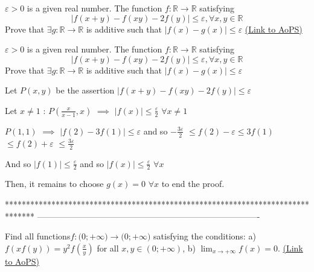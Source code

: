 \begin{problem}
	$\varepsilon>0 $ is a given real number. The function $ f: \mathbb R \to \mathbb R $ satisfying
\[\left | f (x + y)-f (xy)-2f (y) \right | \leq \varepsilon, \forall x, y \in \mathbb R \]
Prove that $ \exists  g: \mathbb R \to \mathbb R$ is additive such that $ \left | f (x)-g (x) \right | \leq \varepsilon $
	\flushright \href{https://artofproblemsolving.com/community/c6h570635}{(Link to AoPS)}
\end{problem}



\begin{solution}
	\begin{tcolorbox}$\varepsilon>0 $ is a given real number. The function $ f: \mathbb R \to \mathbb R $ satisfying
\[\left | f (x + y)-f (xy)-2f (y) \right | \leq \varepsilon, \forall x, y \in \mathbb R \]
Prove that $ \exists  g: \mathbb R \to \mathbb R$ is additive such that $ \left | f (x)-g (x) \right | \leq \varepsilon $\end{tcolorbox}
Let $P(x,y)$ be the assertion $|f(x+y)-f(xy)-2f(y)|\le \varepsilon$

Let $x\ne 1$ : $P(\frac x{x-1},x)$ $\implies$ $|f(x)|\le\frac{\varepsilon}2$ $\forall x\ne 1$

$P(1,1)$ $\implies$  $|f(2)-3f(1)|\le \varepsilon$ and so $-\frac{3\varepsilon}2$ $\le f(2)-\varepsilon\le 3f(1)$ $\le f(2)+\varepsilon$ $\le \frac{3\varepsilon}2$

And so $|f(1)|\le\frac{\varepsilon}2$ and so $|f(x)|\le\frac{\varepsilon}2$ $\forall x$

Then, it remains to choose $g(x)=0$ $\forall x$ to end the proof.
\end{solution}
*******************************************************************************
-------------------------------------------------------------------------------

\begin{problem}
	Find all functions${{f: \mathbb(0;+\infty)}\to\mathbb(0;+\infty)}$ satisfying the conditions: a) $f(xf(y))=y^2f(\frac{x}{y})$ for all $x,y{\in}(0;+\infty)$, b) $\lim_{x\to+\infty}f(x)=0$.
	\flushright \href{https://artofproblemsolving.com/community/c6h570644}{(Link to AoPS)}
\end{problem}



